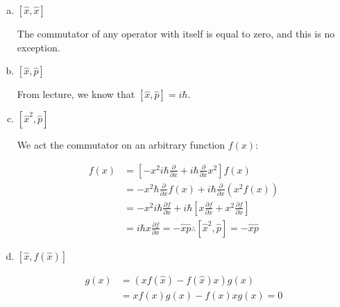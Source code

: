 \documentclass[10pt]{article}
\begin{document}
    \begin{enumerate}[(a)]
        \item $[\hat x, \hat x]$

        \begin{solution}
            The commutator of any operator with itself is equal to zero, and this is no exception.
        \end{solution}
        \item $[\hat x, \hat p]$

        \begin{solution}
            From lecture, we know that $[\hat x, \hat p] = i\hbar$. 
        \end{solution}
        \item $[\hat x^2, \hat p]$

        \begin{solution}
            We act the commutator on an arbitrary function $f(x)$:

            \begin{align*}
                [\hat x^2, \hat p]f(x) &= \left[-x^2i\hbar \frac{\partial}{\partial x} + i\hbar \frac{\partial}{\partial x}x^2\right] f(x)\\
                &= -x^2\hbar \frac{\partial}{\partial x} f(x)+ i\hbar \frac{\partial}{\partial x}(x^2f(x))\\
                &= -x^2i\hbar \frac{\partial f}{\partial x} + i\hbar\left[x \frac{\partial f}{\partial x} + x^2 \frac{\partial f}{\partial x}\right]\\
                &= i\hbar x \frac{\partial f}{\partial x} = -\hat x\hat p
                \therefore [\hat x^2, \hat p] = -\hat x\hat p
            \end{align*}
        \end{solution}
        \item $[\hat x, f(\hat x)]$
        
        \begin{solution}
            \begin{align*}
                [\hat x, f(\hat x)]g(x) &= (xf(\hat x) - f(\hat x)x)g(x)\\
                &= xf(x)g(x) - f(x)xg(x) = 0
            \end{align*}


\end{solution}
\end{enumerate}
\end{document}
